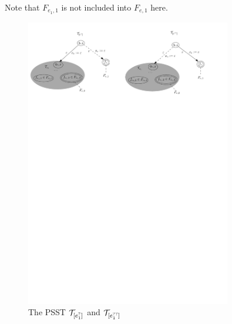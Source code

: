 Note that $F_{e_1,1}$ is not included into $F_{e,1}$ here.
%
		\begin{figure}[tb]
			\centering
			\includegraphics[width = 0.8\textwidth]{reg2pfa-6.pdf}
			\caption{The PSST $\mathcal{T}_{[e_1^?]}$ and $\mathcal{T}_{[e_1^{??}]}$}
			\label{fig-reg2pfa-6}
		\end{figure}

